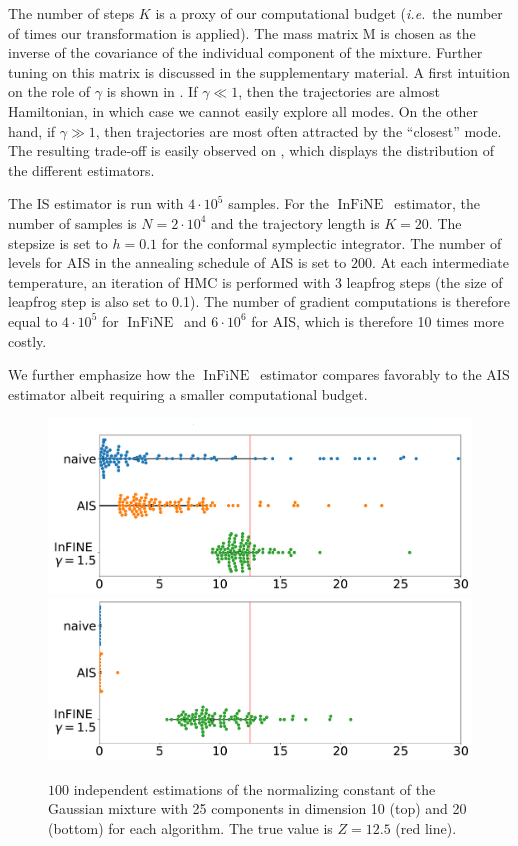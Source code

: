 \documentclass{article}
\def\mass{\mathrm{M}}
\def\IFIS{\ensuremath{\operatorname{InFiNE}}}
\def\ie{\textit{i.e.}}
\newcommand{\1}{\mathds{1}}
\begin{document}
The number of steps $K$ is  a proxy of our computational budget (\ie~the number of times our transformation is applied). The mass matrix $\mass$ is chosen as the inverse of the covariance of the individual component of the mixture. Further tuning on this matrix is discussed in the supplementary material.
A first intuition on the role of $\gamma$ is shown in . If $\gamma \ll 1$, then the trajectories are almost Hamiltonian, in which case we cannot easily explore all modes. On the other hand, if $\gamma \gg 1 $,  then trajectories are most often attracted by the ``closest'' mode. The resulting trade-off is easily observed on , which displays the distribution of the different estimators.


The IS estimator is run with $4 \cdot 10^5$ samples.
For the \IFIS\ estimator, the number of samples is $N = 2 \cdot 10^4$ and the trajectory length is $K=20$. The stepsize is set to $h= 0.1$ for the conformal symplectic integrator.
The number of levels for AIS in the annealing schedule of AIS is set to $200$. At each intermediate temperature, an iteration of HMC is performed with 3 leapfrog steps (the size of leapfrog step is also set to 0.1).
The number of gradient computations is therefore equal to $4 \cdot 10^5$ for \IFIS\ and $6 \cdot 10^6$ for AIS, which is therefore 10 times more costly.

We further emphasize how the \IFIS\ estimator compares favorably to the AIS estimator albeit requiring a smaller computational budget.
\begin{figure}[!ht]
    \centering
    \includegraphics[width= 1.\linewidth]{boxplot_dim10.pdf}
        \includegraphics[width= 1.\linewidth]{boxplot_dim20.pdf}
    \caption{$100$ independent estimations of the normalizing constant of the Gaussian mixture with 25 components in dimension 10 (top) and 20 (bottom) for each algorithm. The true value is $Z=12.5$ (red line).}
    \label{fig:25_gauss}
\end{figure}
\end{document}
